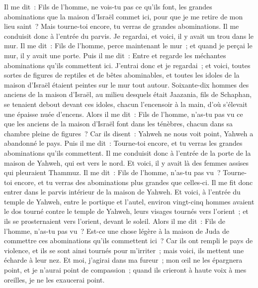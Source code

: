 \begin{multicols}{2}
Il me dit~: Fils de l'homme, ne vois-tu pas ce qu'ils font, les grandes abominations que la maison d'Israël commet ici, pour que je me retire de mon lieu saint~? Mais tourne-toi encore, tu verras de grandes abominations.
Il me conduisit donc à l'entrée du parvis. Je regardai, et voici, il y avait un trou dans le mur.
Il me dit~: Fils de l'homme, perce maintenant le mur~; et quand je perçai le mur, il y avait une porte.
Puis il me dit~: Entre et regarde les méchantes abominations qu'ils commettent ici.
J'entrai donc et je regardai~; et voici, toutes sortes de figures de reptiles et de bêtes abominables, et toutes les idoles de la maison d'Israël étaient peintes sur le mur tout autour.
Soixante-dix hommes des anciens de la maison d'Israël, au milieu desquels était Jaazania, fils de Schaphan, se tenaient debout devant ces idoles, chacun l'encensoir à la main, d'où s'élevait une épaisse nuée d'encens.
Alors il me dit~: Fils de l'homme, n'as-tu pas vu ce que les anciens de la maison d'Israël font dans les ténèbres, chacun dans sa chambre pleine de figures~? Car ils disent~: Yahweh ne nous voit point, Yahweh a abandonné le pays.
Puis il me dit~: Tourne-toi encore, et tu verras les grandes abominations qu'ils commettent.
Il me conduisit donc à l'entrée de la porte de la maison de Yahweh, qui est vers le nord. Et voici, il y avait là des femmes assises qui pleuraient Thammuz.
Il me dit~: Fils de l'homme, n'as-tu pas vu~? Tourne-toi encore, et tu verras des abominations plus grandes que celles-ci.
Il me fit donc entrer dans le parvis intérieur de la maison de Yahweh. Et voici, à l'entrée du temple de Yahweh, entre le portique et l'autel, environ vingt-cinq hommes avaient le dos tourné contre le temple de Yahweh, leurs visages tournés vers l'orient~; et ils se prosternaient vers l'orient, devant le soleil.
Alors il me dit~: Fils de l'homme, n'as-tu pas vu~? Est-ce une chose légère à la maison de Juda de commettre ces abominations qu'ils commettent ici~? Car ils ont rempli le pays de violence, et ils se sont ainsi tournés pour m'irriter~; mais voici, ils mettent une écharde à leur nez.
Et moi, j'agirai dans ma fureur~; mon œil ne les épargnera point, et je n'aurai point de compassion~; quand ils crieront à haute voix à mes oreilles, je ne les exaucerai point.

\end{multicols}
